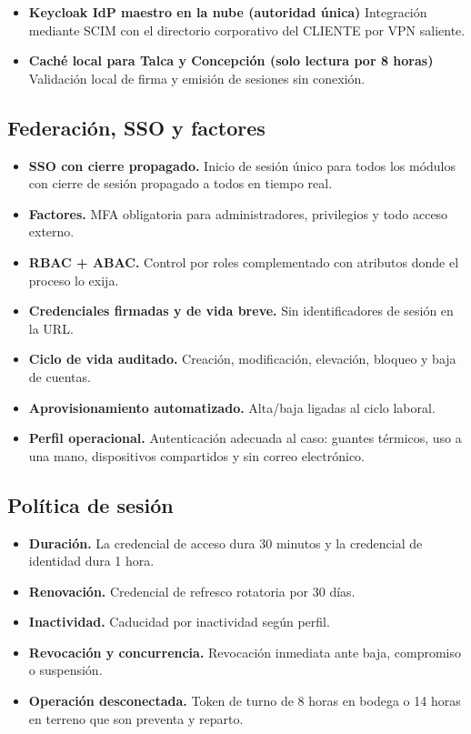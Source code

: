 \begin{itemize}
  \item \textbf{Keycloak IdP maestro en la nube (autoridad única)} Integración mediante SCIM con el directorio corporativo del CLIENTE por VPN saliente.
  \item \textbf{Caché local para Talca  y Concepción (solo lectura por 8 horas)} Validación local de firma y emisión de sesiones sin conexión.
\end{itemize}

\subsection{Federación, SSO y factores}

\begin{itemize}
  \item \textbf{SSO con cierre propagado.} Inicio de sesión único para todos los módulos con cierre de sesión propagado a todos en tiempo real.
  \item \textbf{Factores.} MFA obligatoria para administradores, privilegios y todo acceso externo.
  \item \textbf{RBAC + ABAC.} Control por roles complementado con atributos donde el proceso lo exija.
  \item \textbf{Credenciales firmadas y de vida breve.} Sin identificadores de sesión en la URL.
  \item \textbf{Ciclo de vida auditado.} Creación, modificación, elevación, bloqueo y baja de cuentas.
  \item \textbf{Aprovisionamiento automatizado.} Alta/baja ligadas al ciclo laboral.
  \item \textbf{Perfil operacional.} Autenticación adecuada al caso: guantes térmicos, uso a una mano, dispositivos compartidos y sin correo electrónico.
\end{itemize}

\subsection{Política de sesión}

\begin{itemize}
  \item \textbf{Duración.} La credencial de acceso dura 30 minutos y la credencial de identidad dura 1 hora.
  \item \textbf{Renovación.} Credencial de refresco rotatoria por 30 días.
  \item \textbf{Inactividad.} Caducidad por inactividad según perfil.
  \item \textbf{Revocación y concurrencia.} Revocación inmediata ante baja, compromiso o suspensión.
  \item \textbf{Operación desconectada.} Token de turno de 8 horas en bodega o 14 horas en terreno que son preventa y reparto.
\end{itemize}

